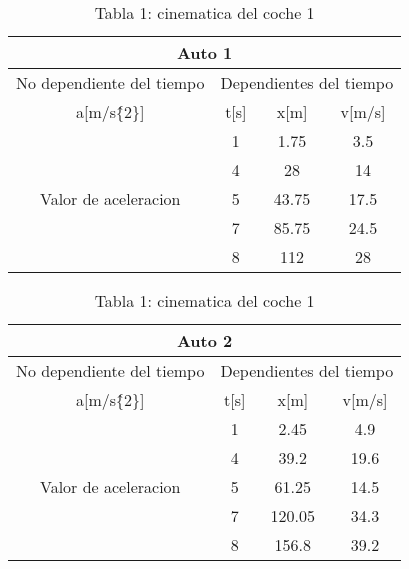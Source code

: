 \documentclass[a4paper, 12pt]{article}
\begin{document}
\begin{table}
 \caption{Tabla 1: cinematica del coche 1}
    \label{Tabla.1}
    \centering
\begin{tabular}{|c|c|c|c|} 
\hline
\multicolumn{4}{|c|}{Auto 1}                                                          \\ 
\hline
No dependiente del tiempo            & \multicolumn{3}{|l|}{Dependientes del tiempo}  \\ 
\hline
a[m/s\^\{2\}]                         & t[s] & x[m]  & v[m/s]                         \\ 
\hline
\multirow{7}{*}{Valor de aceleracion} & 1    & 1.75  & 3.5                            \\ 

\cline{2-4}
                                      & 4    & 28    & 14                             \\ 
\cline{2-4}
                                      & 5    & 43.75 & 17.5                           \\ 
\cline{2-4}
                                      & 7    & 85.75 & 24.5                           \\ 
\cline{2-4}
                                      & 8    & 112   & 28                             \\
\hline
\end{tabular}
\end{table}

\begin{table}
\caption{Tabla 1: cinematica del coche 1}
    \label{Tabla.1}
\centering
\begin{tabular}{|c|c|c|c|} 
\hline
\multicolumn{4}{|c|}{Auto 2}                                                          \\ 
\hline
No dependiente del tiempo             & \multicolumn{3}{l|}{Dependientes del tiempo}  \\ 
\hline
a[m/s\^\{2\}]                         & t[s] & x[m]  & v[m/s]                         \\ 
\hline
\multirow{7}{*}{Valor de aceleracion} & 1    & 2.45  & 4.9                            \\ 
        
\cline{2-4}
                                      & 4    & 39.2    & 19.6                             \\ 
\cline{2-4}
                                      & 5    & 61.25 & 14.5                           \\ 
\cline{2-4}
                                      & 7    & 120.05 & 34.3                           \\ 
\cline{2-4}
                                      & 8    & 156.8   & 39.2                             \\
\hline
\end{tabular}
\end{table}
\end{document}
